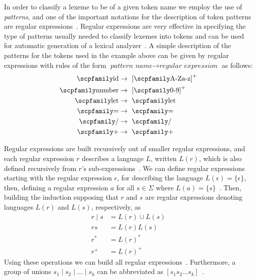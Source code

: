\documentclass[
  oneside,
  english,
  coorientadorbanca,
  noabntexcite
]{ufsc-thesis-rn46-2019}
\newcommand{\code}[1]{\text{\scpfamily\setlength\spaceskip{0.35em}#1}}
\begin{document}
In order to classify a lexeme to be of a given token name we employ the use of \textit{patterns}, and one of the important notations for the description of token patterns are regular expressions~\cite{Aho:2006:CPT:1177220}.
Regular expressions are very effective in specifying the type of patterns usually needed to classify lexemes into tokens and can be used for automatic generation of a lexical analyzer~\cite{Aho:2006:CPT:1177220}.
A simple description of the patterns for the tokens used in the example above can be given by regular expressions with rules of the form $\textit{pattern name} \rightarrow \textit{regular expression}$ as follows:
\begin{equation}\label{eq:regular_definitions}
  \begin{aligned}
    \code{id}     & \rightarrow \ {[\code{A-Za-z}]}^+ \\
    \code{number} & \rightarrow \ {[\code{0-9}]}^+    \\
    \code{let}    & \rightarrow \ \code{let}          \\
    \code{=}      & \rightarrow \ \code{=}            \\
    \code{/}      & \rightarrow \ \code{/}            \\
    \code{+}      & \rightarrow \ \code{+}            \\
  \end{aligned}
\end{equation}

Regular expressions are built recursively out of smaller regular expressions, and each regular expression $r$ describes a language $L$, written $L(r)$, which is also defined recursively from $r$'s sub-expressions~\cite{Aho:2006:CPT:1177220}.
We can define regular expressions starting with the regular expression $\epsilon$, for describing the language $L(\epsilon) = \{ \epsilon \}$, then, defining a regular expression $a$ for all $s \in \Sigma$ where $L(a) = \{ s \}$~\cite{Aho:2006:CPT:1177220}.
Then, building the induction supposing that $r$ and $s$ are regular expressions denoting languages $L(r)$ and $L(s)$, respectively, as
\begin{align*}
  r \mid s & = L(r) \cup L(s) \\
  r s      & = L(r) L(s)      \\
  r^*      & = {L{(r)}}^*     \\
  r^+      & = {L{(r)}}^+
\end{align*}
Using these operations we can build all regular expressions~\cite{Aho:2006:CPT:1177220}.
Furthermore, a group of unions $s_1 \mid s_2 \mid \dots \mid s_k$ can be abbreviated as $[s_1 s_2 \dots s_k]$~\cite{Aho:2006:CPT:1177220}.
\end{document}
